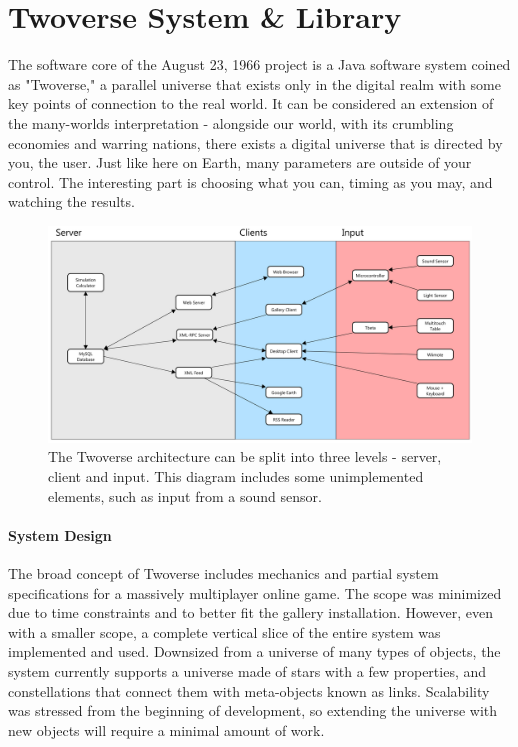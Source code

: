 \section{Twoverse System \& Library}
The software core of the August 23, 1966 project is a Java software system coined as "Twoverse," a parallel universe that exists only in the digital realm with some key points of connection to the real world. It can be considered an extension of the many-worlds interpretation - alongside our world, with its crumbling economies and warring nations, there exists a digital universe that is directed by you, the user. Just like here on Earth, many parameters are outside of your control. The interesting part is choosing what you can, timing as you may, and watching the results.

\begin{figure}[htp]\centering
\includegraphics[width=.99\textwidth]{images/twoverse_arch.jpg}
  \caption{The Twoverse architecture can be split into three levels - server, client and input. This diagram includes some unimplemented elements, such as input from a sound sensor.}\label{fig:twoversearch}
\end{figure}
\paragraph{System Design}
The broad concept of Twoverse includes mechanics and partial system specifications for a massively multiplayer online game. The scope was minimized due to time constraints and to better fit the gallery installation. However, even with a smaller scope, a complete vertical slice of the entire system was implemented and used. Downsized from a universe of many types of objects, the system currently supports a universe made of stars with a few properties, and constellations that connect them with meta-objects known as links. Scalability was stressed from the beginning of development, so extending the universe with new objects will require a minimal amount of work.

